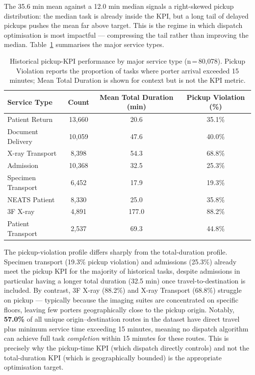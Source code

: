 \documentclass[12pt,a4paper]{article}
\begin{document}
The 35.6 min mean against a 12.0 min median signals a right-skewed pickup distribution: the median task is already inside the KPI, but a long tail of delayed pickups pushes the mean far above target. This is the regime in which dispatch optimisation is most impactful --- compressing the tail rather than improving the median. Table~\ref{tab:by_service} summarises the major service types.

\begin{table}[H]
\centering
\caption{Historical pickup-KPI performance by major service type (n\,=\,80{,}078). Pickup Violation reports the proportion of tasks where porter arrival exceeded 15 minutes; Mean Total Duration is shown for context but is not the KPI metric.}
\label{tab:by_service}
\begin{tabular}{lccc}
\toprule
\textbf{Service Type} & \textbf{Count} & \textbf{Mean Total Duration (min)} & \textbf{Pickup Violation (\%)} \\
\midrule
Patient Return          & 13{,}660  & 20.6  & 35.1\% \\
Document Delivery       & 10{,}059  & 47.6  & 40.0\% \\
X-ray Transport         &  8{,}398  & 54.3  & 68.8\% \\
Admission               & 10{,}368  & 32.5  & 25.3\% \\
Specimen Transport      &  6{,}452  & 17.9  & 19.3\% \\
NEATS Patient           &  8{,}330  & 25.0  & 35.8\% \\
3F X-ray                &  4{,}891  & 177.0 & 88.2\% \\
Patient Transport       &  2{,}537  & 69.3  & 44.8\% \\
\bottomrule
\end{tabular}
\end{table}

The pickup-violation profile differs sharply from the total-duration profile. Specimen transport (19.3\% pickup violation) and admissions (25.3\%) already meet the pickup KPI for the majority of historical tasks, despite admissions in particular having a longer total duration (32.5 min) once travel-to-destination is included. By contrast, 3F X-ray (88.2\%) and X-ray Transport (68.8\%) struggle on pickup --- typically because the imaging suites are concentrated on specific floors, leaving few porters geographically close to the pickup origin. Notably, \textbf{57.0\%} of all unique origin--destination routes in the dataset have direct travel plus minimum service time exceeding 15 minutes, meaning no dispatch algorithm can achieve full task \textit{completion} within 15 minutes for these routes. This is precisely why the pickup-time KPI (which dispatch directly controls) and not the total-duration KPI (which is geographically bounded) is the appropriate optimisation target.
\end{document}
